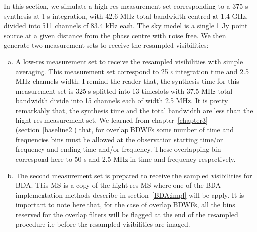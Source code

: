 \documentclass[useAMS,usenatbib]{mn2e}
\begin{document}
In this section, we simulate a high-res measurement set corresponding to a 
375 s synthesis at 1 s integration, with 42.6 MHz total bandwidth
centred  at 1.4 GHz, divided into 511 channels of 83.4 kHz each. The sky model is a single 1 Jy point source at 
a given distance from the phase centre with noise free. We then generate two measurement sets to receive the 
resampled visibilities:
 \begin{enumerate}[(a)]
  \item A low-res measurement set to receive the resampled visibilities with simple averaging. This measurement set correspond to 
  25 s integration time and 2.5 MHz channels width. I remind the reader that, the synthesis time for this measurement set is
  325 s splitted into 13 timeslots with  37.5 MHz total bandwidth divide into 15 channels each of width 2.5 MHz.
  It is pretty remarkably that, the synthesis time and the total bandwidth are less than the hight-res measurement set.
  We learned from chapter~\ref{chapter3} (section~\ref{baseline2}) that, for overlap BDWFs some number of time and frequencies bins must
  be allowed at the observation starting time/or frequency and ending time and/or frequency. These overlapping bin correspond
  here  to 50 s and 2.5 MHz in time and frequency respectively.
  \item The second measurement set is prepared to receive the sampled visibilities for BDA. This MS is a copy of the hight-res MS where 
    one of the BDA implementation methods describe in section~\ref{BDA:impl} will be apply. It is important to note here that,
    for the case of overlap BDWFs, all the bins reserved for the overlap filters will be flagged at the end of the resampled 
    procedure i.e before the resampled visibilities are imaged.
\end{enumerate}
\end{document}
